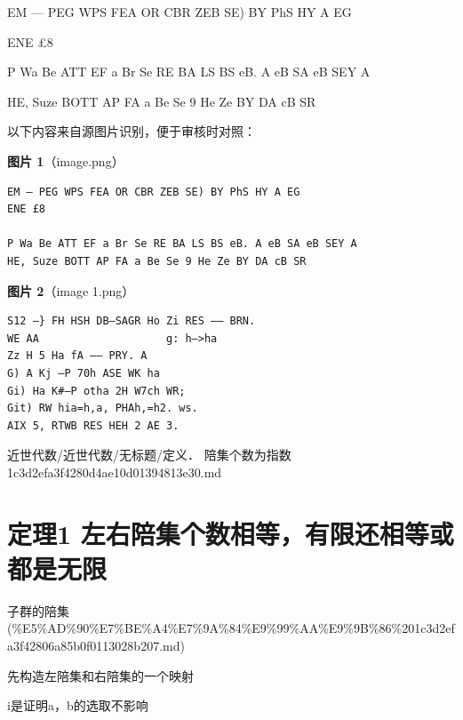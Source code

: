 \begin{definition}[定义． 陪集个数为指数]

EM — PEG WPS FEA OR CBR ZEB SE) BY PhS HY A EG

ENE £8

P Wa Be ATT EF a Br Se RE BA LS BS eB. A eB SA eB SEY A

HE, Suze BOTT AP FA a Be Se 9 He Ze BY DA cB SR

\end{definition}

\begin{note}
以下内容来自源图片识别，便于审核时对照：

\textbf{图片 1}（image.png）
\begin{Verbatim}[fontsize=\small]
EM — PEG WPS FEA OR CBR ZEB SE) BY PhS HY A EG
ENE £8

P Wa Be ATT EF a Br Se RE BA LS BS eB. A eB SA eB SEY A
HE, Suze BOTT AP FA a Be Se 9 He Ze BY DA cB SR
\end{Verbatim}

\textbf{图片 2}（image 1.png）
\begin{Verbatim}[fontsize=\small]
S12 —} FH HSH DB—SAGR Ho Zi RES —— BRN.
WE AA                    g: h—>ha
Zz H 5 Ha fA —— PRY. A
G) A Kj —P 70h ASE WK ha
Gi) Ha K#—P otha 2H W7ch WR;
Git) RW hia=h,a, PHAh,=h2. ws.
AIX 5, RTWB RES HEH 2 AE 3.
\end{Verbatim}

\end{note}

\begin{note}[来源路径]

近世代数/近世代数/无标题/定义． 陪集个数为指数 1c3d2efa3f4280d4ae10d01394813e30.md

\end{note}

\section*{定理1 左右陪集个数相等，有限还相等或都是无限}

\begin{note}[来源上级主题]

子群的陪集 (\%E5\%AD\%90\%E7\%BE\%A4\%E7\%9A\%84\%E9\%99\%AA\%E9\%9B\%86\%201c3d2efa3f42806a85b0f0113028b207.md)

\end{note}

\begin{theorem}

先构造左陪集和右陪集的一个映射

i是证明a，b的选取不影响

\end{theorem}

